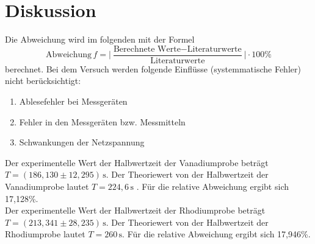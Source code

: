 \section{Diskussion}
\label{sec:Diskussion}
Die Abweichung wird im folgenden mit der Formel
\begin{equation}
    \text{Abweichung} \,f = \Big\vert\frac{\text{Berechnete Werte}-\text{Literaturwerte}}{\text{Literaturwerte}}\Big\vert \cdot 100 \%
\end{equation}
berechnet. 
Bei dem Versuch werden folgende Einflüsse (systemmatische Fehler) nicht berücksichtigt:
\begin{enumerate}
    \item Ablesefehler bei Messgeräten
    \item Fehler in den Messgeräten bzw. Messmitteln
    \item Schwankungen der Netzspannung
\end{enumerate}
Der experimentelle Wert der Halbwertzeit der Vanadiumprobe beträgt \(T=(186,130 \pm 12,295)\,\mathrm{s}\).
Der Theoriewert  von der Halbwertzeit der Vanadiumprobe lautet \(T = 224,6\,\mathrm{s}\) \cite{2}.
Für die relative Abweichung ergibt sich 17,128\%. \\
Der experimentelle Wert der Halbwertzeit der Rhodiumprobe beträgt \(T = (213,341 \pm 28,235)\,\mathrm{s}\).
Der Theoriewert  von der Halbwertzeit der Rhodiumprobe lautet \(T = 260\,\mathrm{s}\)\cite{3}.
Für die relative Abweichung ergibt sich 17,946\%.
